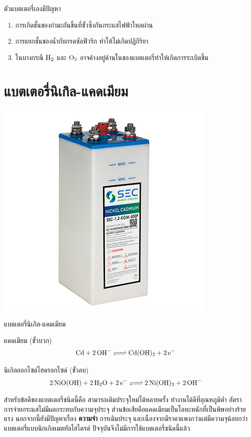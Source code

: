 \documentclass[a4paper,nobib,openany,10pt]{tufte-book}
\begin{document}
ตัวแบตเตอรี่เองมีปัญหา

\begin{enumerate}
\item การเกิดชั้นของกำมะถันขึ้นที่ขั้วซึ่งกันกระแสไฟฟ้าไหลผ่าน
\item การแยกชั้นของน้ำกับกรดซัลฟิวริก ทำให้ไม่เกิดปฏิกิริยา
\item ในบางกรณี \(\ce{H2}\) และ \(\ce{O2}\) อาจค้างอยู่ด้านในของแบตเตอรี่ทำให้เกิดการระเบิดขึ้น
\end{enumerate}

\section{แบตเตอรี่นิเกิล-แคดเมียม}
\label{sec:orgcc696f7}

\begin{marginfigure}
  \centering
  \includegraphics[width=\textwidth]{pictures/nickel-cadmium-battery}
\caption{แบตเตอรี่นิเกิล-แคดเมียม}
\end{marginfigure}

แคดเมียม (ขั้วบวก)
$$ \ce{Cd + 2OH^- <=> Cd(OH)_2 + 2e^-} $$

นิเกิลออกไซด์ไฮดรอกไซด์ (ขั้วลบ)
$$ \ce{2NiO(OH) + 2H_2O + 2e^- <=> 2Ni(OH)_2 + 2OH^-} $$

สำหรับข้อดีของแบตเตอรี่ชนิดนี้คือ สามารถเติมประจุใหม่ได้หลายครั้ง ทำงานได้ดีที่อุณหภูมิต่ำ อัตราการจ่ายกระแสไม่มีผลกระทบกับความจุประจุ ส่วนข้อเสียคือแคดเมียมเป็นโลหะหนักที่เป็นพิษอย่างร้ายแรง นอกจากนี้ยังมีปัญหาเรื่อง \textbf{ความจำ} การเติมประจุ และเนื่องจากมีราคาแพงกว่าแต่มีความจุน้อยกว่าแบตเตอรี่แบบนิกเกิลเมตทัลไฮไดรด์ ปัจจุบันจึงไม่มีการใช้แบตเตอรี่ชนิดนี้แล้ว
\end{document}
